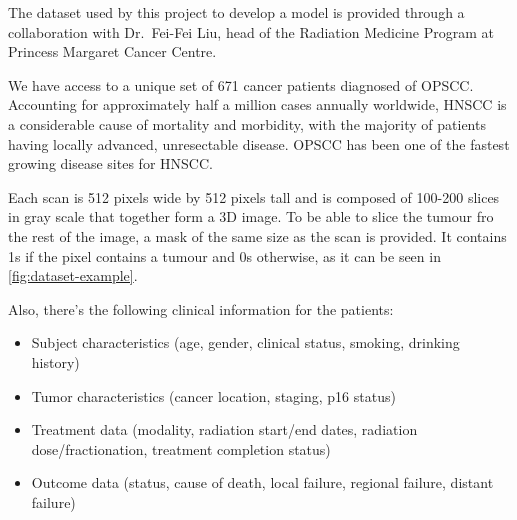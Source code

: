 
The dataset used by this project to develop a model is provided through a 
collaboration with Dr.~Fei-Fei Liu, head of the Radiation Medicine Program at Princess
Margaret Cancer Centre. 

We have access to a unique set of 671 cancer patients diagnosed of \gls{OPSCC}. Accounting
for approximately half a million cases annually worldwide, \gls{HNSCC} 
is a considerable cause of mortality and morbidity, with the majority of patients having
locally advanced, unresectable disease. \gls{OPSCC} has been one of the fastest growing 
disease sites for \gls{HNSCC}.
~\cite{medical:ct-based-radiomic-signature}

Each scan is 512 pixels wide by 512 pixels tall and is composed 
of 100-200 slices in gray scale that together form a 3D image. To be able to slice the tumour
fro the rest of the image, a mask of the same size as the scan is provided. It contains 1s 
if the pixel contains a tumour and 0s otherwise, as it can be seen in \autoref{fig:dataset-example}.

Also, there's the following clinical information for the patients:
\begin{itemize}
  \item Subject characteristics (age, gender, clinical status, smoking, drinking history)
  \item Tumor characteristics (cancer location, staging, p16 status)
  \item Treatment data (modality, radiation start/end dates, radiation dose/fractionation, 
  treatment completion status)
  \item Outcome data (status, cause of death, local failure, regional failure, distant failure)
\end{itemize}

